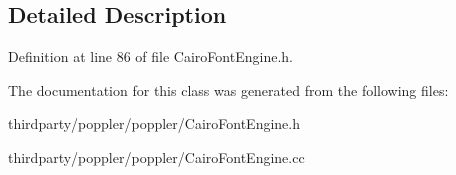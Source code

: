 \subsection{Detailed Description}


Definition at line 86 of file Cairo\+Font\+Engine.\+h.



The documentation for this class was generated from the following files\+:\begin{DoxyCompactItemize}
\item 
thirdparty/poppler/poppler/Cairo\+Font\+Engine.\+h\item 
thirdparty/poppler/poppler/Cairo\+Font\+Engine.\+cc\end{DoxyCompactItemize}
